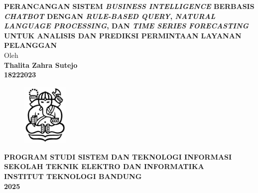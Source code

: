 \documentclass[12pt,a4paper,oneside]{book}
\begin{document}
\begin{titlepage}
\begin{center}
    
    {\large\bfseries PERANCANGAN SISTEM \textit{BUSINESS INTELLIGENCE} BERBASIS \textit{CHATBOT} DENGAN \textit{RULE-BASED QUERY}, \textit{NATURAL LANGUAGE PROCESSING}, DAN \textit{TIME SERIES FORECASTING} UNTUK ANALISIS DAN PREDIKSI PERMINTAAN LAYANAN PELANGGAN}\\
    
    
    {\large Oleh}\\[0.3cm]
    \textbf{
    {\large Thalita Zahra Sutejo}\\
    {\large 18222023}
    }\\

    \vspace{2cm}
    
    \begin{figure}[h]
    \centering
    \includegraphics[width=0.2\textwidth]{ganesha.jpg}
    \end{figure}
    
     \vspace{4cm}

    \textbf{
    {\large PROGRAM STUDI SISTEM DAN TEKNOLOGI INFORMASI}\\
    {\large SEKOLAH TEKNIK ELEKTRO DAN INFORMATIKA}\\
    {\large INSTITUT TEKNOLOGI BANDUNG}\\
    {\large 2025}
    }
\end{center}
\end{titlepage}
\end{document}
